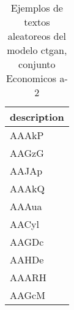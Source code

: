 \begin{table}[H]
\centering
\fontsize{8}{14}\selectfont
\caption{Ejemplos de textos aleatoreos del modelo ctgan, conjunto Economicos a-2}
\label{table-sample10-economicos-a-2-ctgan-text}
\begin{tabular}{|m{50em}|}
\hline
\rowcolor[gray]{0.8}
description \\
\hline AAAkP \\
\hline AAGzG \\
\hline AAJAp \\
\hline AAAkQ \\
\hline AAAua \\
\hline AACyl \\
\hline AAGDc \\
\hline AAHDe \\
\hline AAARH \\
\hline AAGcM \\
\hline
\end{tabular}
\end{table}
